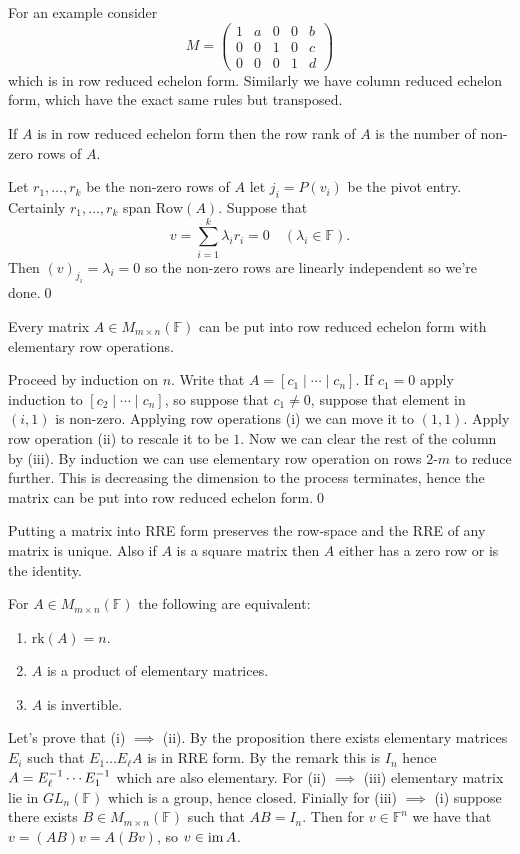 \documentclass{article}
\newcommand{\F}{\mathbb{F}}
\newcommand{\rk}{\mathrm{rk}}
\newcommand{\Row}{\mathrm{Row}}
\begin{document}
For an example consider
\[
  M=\begin{pmatrix}
	  1 & a & 0 & 0 & b\\
	  0 & 0 & 1 & 0 & c\\
	  0 & 0 & 0 & 1 & d
  \end{pmatrix}
\]
which is in row reduced echelon form. Similarly we have column reduced echelon form, which have the exact same rules but transposed.
\begin{lemma}
  If $ A $ is in row reduced echelon form then the row rank of $ A $ is the number of non-zero rows of $ A $.
\end{lemma}
\pf Let $ r_1,\dots, r_k $ be the non-zero rows of $ A $ let $ j_i=P(v_i) $ be the pivot entry. Certainly $ r_1,\dots, r_k $ span $ \Row(A) $. Suppose that
\[
	v=\sum_{i=1}^k\lambda_ir_i=0\quad (\lambda_i\in\F).
\]
Then $ (v)_{j_i} =\lambda_i=0 $ so the non-zero rows are linearly independent so we're done.\qed
\begin{proposition}
	Every matrix $ A \in M_{m\times n}(\F) $ can be put into row reduced echelon form with elementary row operations.
\end{proposition}
\pf Proceed by induction on $ n $. Write that $ A=\left[c_1\mid \cdots \mid c_n\right] $. If $ c_1=0 $ apply induction to $ [c_2\mid \cdots \mid c_n] $, so suppose that $ c_1\ne 0 $, suppose that element in $ (i,1) $ is non-zero. Applying row operations (i) we can move it to $ (1,1) $.  Apply row operation (ii) to rescale it to be $ 1 $. Now we can clear the rest of the column by (iii). By induction we can use elementary row operation on rows $ 2$-$ m $ to reduce further. This is decreasing the dimension to the process terminates, hence the matrix can be put into row reduced echelon form.\qed
\begin{remark}
  Putting a matrix into RRE form preserves the row-space and the RRE of any matrix is unique. Also if $ A $ is a square matrix then $ A $ either has a zero row or is the identity. 
\end{remark}
\begin{theorem}
	For $ A\in M_{m\times n}(\F) $ the following are equivalent:
	\begin{enumerate}
		\item $ \rk (A)=n $.
		\item $ A $ is a product of elementary matrices.
		\item $ A $ is invertible.
	\end{enumerate}
\end{theorem}
\pf Let's prove that (i) $ \implies $ (ii). By the proposition there exists elementary matrices $ E_i $ such that $ E_1\dots E_\ell A $ is in RRE form. By the remark this is $ I_n $ hence $ A={E}^{-1}_\ell\cdots {E}^{-1}_1 $ which are also elementary. For (ii) $ \implies $ (iii) elementary matrix lie in $ GL_n(\F) $ which is a group, hence closed. Finially for (iii) $ \implies $ (i) suppose there exists $ B\in M_{m\times n}(\F) $ such that $ AB=I_n $. Then for $ v\in \F^n $ we have that $ v=(AB)v=A(Bv) $, so $ v\in \operatorname{im} A $.
\end{document}
